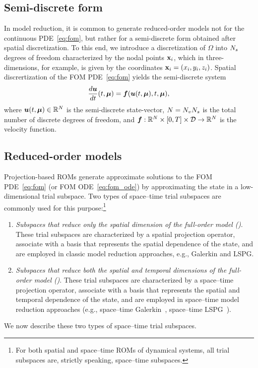 \documentclass[3p,computermodern,10pt]{elsarticle}
\begin{document}
\subsection{Semi-discrete form}
In model reduction, it is common to generate reduced-order models not for the continuous PDE~\eqref{eq:fom}, but rather for a semi-discrete form obtained after spatial discretization. To this end, we introduce a discretization of $\Omega$ into $N_s$ degrees of freedom characterized by the nodal points $\mathbf{x}_i$, which in three-dimensions, for example, is given by the coordinates $\mathbf{x}_i = (x_i,y_i,z_i)$. Spatial discrertization of the FOM PDE~\eqref{eq:fom} yields the semi-discrete system  
\begin{equation}\label{eq:fom_ode}
\frac{d \boldsymbol u}{dt}(t,\boldsymbol \mu) = \boldsymbol f(\boldsymbol u(t,\boldsymbol \mu),t,\boldsymbol \mu),
\end{equation}
where $\boldsymbol u(t,\boldsymbol \mu) \in \mathbb{R}^{N}$ is the semi-discrete state-vector, $N = N_v N_s$ is the total number of discrete degrees of freedom, and $\boldsymbol f: \mathbb{R}^{N} \times [0,T] \times \mathcal{D} \rightarrow \mathbb{R}^{N}$ is the velocity function.

 \subsection{Reduced-order models}
Projection-based ROMs generate approximate solutions to the FOM
	PDE~\eqref{eq:fom} (or FOM ODE~\eqref{eq:fom_ode}) by approximating the state in a low-dimensional trial
	subspace. Two types of space--time trial subspaces are commonly used for
	this purpose:\footnote{For both spatial and space--time ROMs of dynamical systems, all trial subspaces are, strictly speaking, space--time subspaces.} 
\begin{enumerate} 
	\item \textit{Subspaces that reduce only the spatial dimension of the full-order
		model (\spatialAcronym)}. These trial subspaces are characterized by a spatial projection operator, associate with a basis that represents the spatial dependence of the state, and are employed in classic model reduction approaches, e.g., Galerkin and LSPG. %
	\item \textit{Subspaces that reduce both the spatial and temporal dimensions of the full-order
		model (\spaceTimeAcronym)}.
These trial subspaces are characterized by a space--time projection operator, associate with a basis that represents the spatial and temporal dependence of the state, and are employed in space--time 
model reduction approaches (e.g., space--time Galerkin~\cite{benner_st}, space--time LSPG~\cite{choi_stlspg}). 
\end{enumerate}
 We now describe these two types of space--time trial subspaces.%
\end{document}
